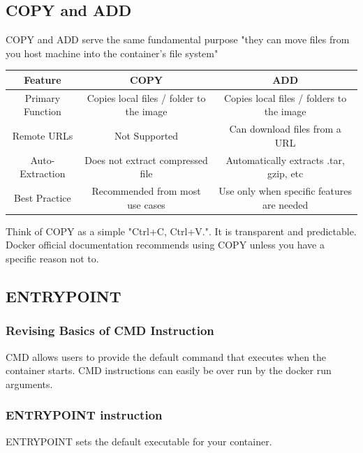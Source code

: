 \documentclass[11pt]{book}
\begin{document}
    \subsection{COPY and ADD}
    COPY and ADD serve the same fundamental purpose
    "they can move files from you host machine into the container's file system"

    \begin{table}[ht]
        \centering
        \begin{tabular}{|c|c|c|}
            \hline
            Feature         & COPY & ADD \\ \hline
            Primary Function             & Copies local files / folder to the image                 & Copies local files / folders to the image    \\ \hline
            Remote URLs         & Not Supported                & Can download files from a URL   \\ \hline
            Auto-Extraction     & Does not extract compressed file                & Automatically extracts .tar, gzip, etc    \\ \hline
            Best Practice & Recommended from most use cases & Use only when specific features are needed   \\ \hline
        \end{tabular}
    \end{table}

    Think of COPY as a simple "Ctrl+C, Ctrl+V.". It is transparent and predictable.
    Docker official documentation recommends using COPY unless you have a specific reason not to.

    \subsection{ENTRYPOINT}
    \subsubsection{Revising Basics of CMD Instruction}
    CMD allows users to provide the default command that executes when the container starts.
    CMD instructions can easily be over run by the docker run arguments.

    \subsubsection{ENTRYPOINT instruction}
    ENTRYPOINT sets the default executable for your container.
\end{document}
